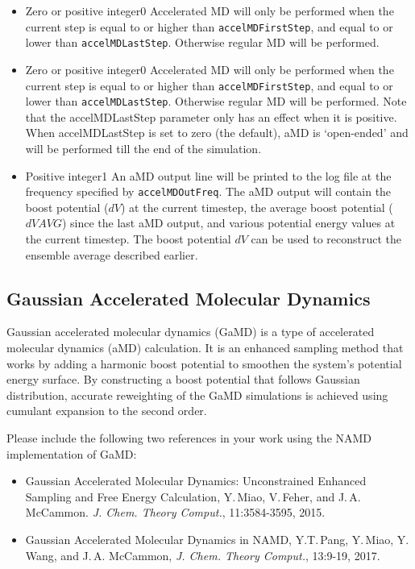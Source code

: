 \begin{itemize}
\item
{}
{Zero or positive integer}{0}
{Accelerated MD will only be performed when the current step is equal to or higher than {\tt accelMDFirstStep}, and equal to or lower than {\tt accelMDLastStep}. Otherwise regular MD will be performed.
}
\item
{}
{Zero or positive integer}{0}
{Accelerated MD will only be performed when the current step is equal to or higher than {\tt accelMDFirstStep}, and equal to or lower than {\tt accelMDLastStep}. Otherwise regular MD will be performed. Note that the accelMDLastStep parameter only has an effect when it is positive. When accelMDLastStep is set to zero (the default), aMD is `open-ended' and will be performed
till the end of the simulation. 
}

\item
{}
{Positive integer}{1}
{An aMD output line will be printed to the log file at the frequency specified by {\tt accelMDOutFreq}.
The aMD output will contain the boost potential ($dV$) at the current timestep, 
the average boost potential ($dVAVG$) since the last aMD output, and various potential energy values at the current timestep.
The boost potential $dV$ can be used to reconstruct the ensemble average described earlier.
}

\end{itemize}


\subsection{Gaussian Accelerated Molecular Dynamics}
\label{section:accelmdg}
Gaussian accelerated molecular dynamics (GaMD) \cite{MIAO2015mc} is a type of accelerated molecular dynamics (aMD) calculation. It is an enhanced sampling method that works by adding a harmonic boost potential to smoothen the system's potential energy surface. 
By constructing a boost potential that follows Gaussian distribution, accurate reweighting of the GaMD simulations is achieved using cumulant expansion to the second order.  


Please include the following two references in your work using the NAMD implementation of GaMD:
\begin{itemize}
  \item {Gaussian Accelerated Molecular Dynamics: Unconstrained Enhanced Sampling and Free Energy Calculation, Y.\,Miao, V.\,Feher, and J.\,A. McCammon. {\it J. Chem. Theory Comput.}, 11:3584-3595, 2015.}
  \item{Gaussian Accelerated Molecular Dynamics in NAMD, Y.T.\,Pang, Y.\,Miao, Y.\,Wang, and J.\,A. McCammon, {\it J. Chem. Theory Comput.}, 13:9-19, 2017.}
\end{itemize}

